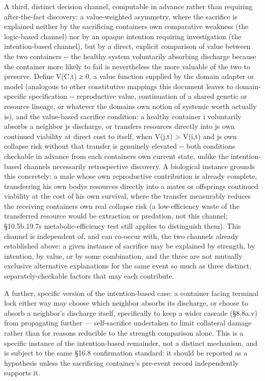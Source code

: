 \documentclass[
]{article}
\begin{document}
A third, distinct decision channel, computable in advance rather than
requiring after-the-fact discovery: a value-weighted asymmetry, where
the sacrifice is explained neither by the sacrificing containers own
comparative weakness (the logic-based channel) nor by an opaque
intention requiring investigation (the intention-based channel), but by
a direct, explicit comparison of value between the two containers -\/-
the healthy system voluntarily absorbing discharge because the container
more likely to fail is nevertheless the more valuable of the two to
preserve. Define V(C,t) ≥ 0, a value function supplied by the domain
adapter or model (analogous to other constitutive mappings this document
leaves to domain-specific specification -\/- reproductive value,
continuation of a shared genetic or resource lineage, or whatever the
domains own notion of systemic worth actually is), and the value-based
sacrifice condition: a healthy container i voluntarily absorbs a
neighbor js discharge, or transfers resources directly into js own
continued viability at direct cost to itself, when V(j,t) \textgreater{}
V(i,t) and js own collapse risk without that transfer is genuinely
elevated -\/- both conditions checkable in advance from each containers
own current state, unlike the intention-based channels necessarily
retrospective discovery. A biological instance grounds this concretely:
a male whose own reproductive contribution is already complete,
transferring his own bodys resources directly into a mates or offsprings
continued viability at the cost of his own survival, where the transfer
measurably reduces the receiving containers own real collapse risk (a
low-efficiency waste of the transferred resource would be extraction or
predation, not this channel; §10.5b.19.7s metabolic-efficiency test
still applies to distinguish them). This channel is independent of, and
can co-occur with, the two channels already established above: a given
instance of sacrifice may be explained by strength, by intention, by
value, or by some combination, and the three are not mutually exclusive
alternative explanations for the same event so much as three distinct,
separately-checkable factors that may each contribute.

A further, specific version of the intention-based case: a container
facing terminal lock either way may choose which neighbor absorbs its
discharge, or choose to absorb a neighbor's discharge itself,
specifically to keep a wider cascade (§8.8a.v) from propagating further
--- self-sacrifice undertaken to limit collateral damage rather than for
reasons reducible to the strength comparison alone. This is a specific
instance of the intention-based remainder, not a distinct mechanism, and
is subject to the same §16.8 confirmation standard: it should be
reported as a hypothesis unless the sacrificing container's pre-event
record independently supports it.
\end{document}
